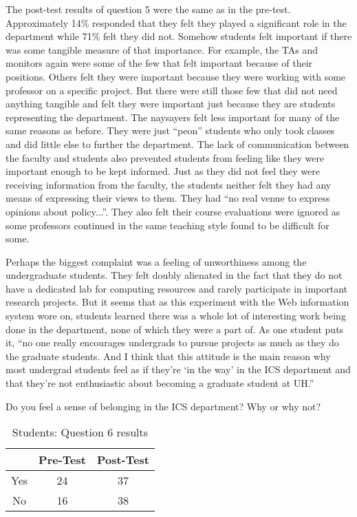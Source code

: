 The post-test results of question 5 were the same as in the pre-test.
Approximately 14\% responded that they felt they played a significant role in
the department while 71\% felt they did not.  Somehow students felt important
if there was some tangible measure of that importance.  For example, the TAs
and monitors again were some of the few that felt important because of their
positions.  Others felt they were important because they were working with some
professor on a specific project.  But there were still those few that did not
need anything tangible and felt they were important just because they are
students representing the department.  The naysayers felt less important for
many of the same reasons as before.  They were just ``peon'' students who only
took classes and did little else to further the department.  The lack of
communication between the faculty and students also prevented students from
feeling like they were important enough to be kept informed.  Just as they did
not feel they were receiving information from the faculty, the students neither
felt they had any means of expressing their views to them.  They had ``no real
venue to express opinions about policy...''.  They also felt their course
evaluations were ignored as some professors continued in the same teaching
style found to be difficult for some.

Perhaps the biggest complaint was a feeling of unworthiness among the
undergraduate students.  They felt doubly alienated in the fact that they do
not have a dedicated lab for computing resources and rarely participate in
important research projects.  But it seems that as this experiment with the Web
information system wore on, students learned there was a whole lot of
interesting work being done in the department, none of which they were a part
of.  As one student puts it, ``no one really encourages undergrads to pursue
projects as much as they do the graduate students.  And I think that this
attitude is the main reason why most undergrad students feel as if they're `in
the way' in the ICS department and that they're not enthusiastic about becoming
a graduate student at UH.''

\begin{table}[htb]
\caption{Students: Question 6 results}
{Do you feel a sense of belonging in the ICS department?  Why or why not?}
\begin{center}
\begin{tabular}{|c|c|c|} \hline
  & {\bf Pre-Test} & {\bf Post-Test} \\ \hline 
 Yes & 24 & 37 \\ \hline 
 No & 16 & 38 \\ \hline 
\end{tabular}
\end{center}
\label{tab:question6s}
\end{table}

